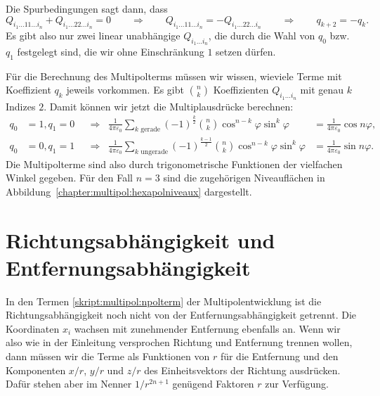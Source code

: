 Die Spurbedingungen sagt dann, dass
\[
Q_{i_1\dots 11\dots i_n}
+
Q_{i_1\dots 22\dots i_n}
=
0
\qquad\Rightarrow\qquad
Q_{i_1\dots 11\dots i_n}
=-
Q_{i_1\dots 22\dots i_n}
\qquad\Rightarrow\qquad
q_{k+2}=-q_k.
\]
Es gibt also nur zwei linear unabhängige $Q_{i_1\dots i_n}$, die durch
die Wahl von $q_0$ bzw.~$q_1$ festgelegt sind, die wir ohne Einschränkung
$1$ setzen dürfen.

Für die Berechnung des Multipolterms müssen wir wissen, wieviele Terme 
mit Koeffizient $q_k$ jeweils vorkommen.
Es gibt $\binom{n}{k}$ Koeffizienten $Q_{i_1\dots i_n}$ mit genau $k$
Indizes $2$.
Damit können wir jetzt die Multiplausdrücke berechnen:
\begin{align*}
q_0&=1, q_1=0
&
&\Rightarrow&
\frac{1}{4\pi\varepsilon_0}
\sum_{\text{$k$ gerade}} (-1)^{\frac{k}2}\binom{n}{k}
	\cos^{n-k}\varphi \sin^k\varphi
&=
\frac{1}{4\pi\varepsilon_0}
\cos n\varphi,
\\
q_0&=0, q_1=1
&
&\Rightarrow&
\frac{1}{4\pi\varepsilon_0}
\sum_{\text{$k$ ungerade}} (-1)^{\frac{k-1}2}\binom{n}{k}
	\cos^{n-k}\varphi \sin^k\varphi
&=
\frac{1}{4\pi\varepsilon_0}
\sin n\varphi.
\end{align*}
Die Multipolterme sind also durch trigonometrische Funktionen der
vielfachen Winkel gegeben.
Für den Fall $n=3$ sind die zugehörigen Niveauflächen in
Abbildung~\ref{chapter:multipol:hexapolniveaux} dargestellt.

\section{Richtungsabhängigkeit und Entfernungsabhängigkeit}
In den Termen \eqref{skript:multipol:npolterm} der Multipolentwicklung
ist die Richtungsabhängigkeit noch nicht von der Entfernungsabhängigkeit
getrennt.
Die Koordinaten $x_i$ wachsen mit zunehmender Entfernung ebenfalls an.
Wenn wir also wie in der Einleitung versprochen Richtung und Entfernung
trennen wollen, dann müssen wir die Terme als Funktionen von $r$ für die
Entfernung und den Komponenten $x/r$, $y/r$ und $z/r$ des Einheitsvektors
der Richtung ausdrücken.
Dafür stehen aber im Nenner $1/r^{2n+1}$ genügend Faktoren $r$ zur Verfügung.

